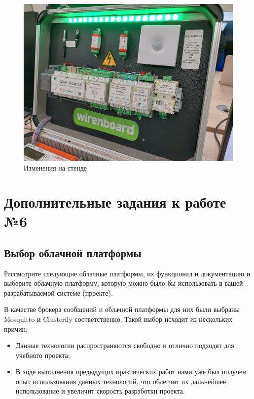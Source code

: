 \documentclass[a4paper,14pt]{extarticle}
\begin{document}
\begin{problem}
	
	\begin{figure}[htbp]
		\centering
		\includegraphics[width=0.6\linewidth]{images/ssh-powershell4.1}
		\caption{Изменения на стенде}
		\label{fig:ssh-stend}
	\end{figure}
	
\end{problem}


\newpage
\section{Дополнительные задания к работе №6}
\subsection{Выбор облачной платформы}

\begin{problem}
	Рассмотрите следующие облачные платформы, их функционал и документацию и выберите
	облачную платформу, которую можно было бы использовать в вашей разрабатываемой
	системе (проекте).
	
	
	\nonum
	
	В качестве брокера сообщений и облачной платформы для них были выбраны Mosquitto и Clusterfly соответственно. Такой выбор исходит из нескольких причин:
	\begin{itemize}
		\item Данные технологии распространяются свободно и отлично подходят для учебного проекта;
		
		\item В ходе выполнения предыдущих практических работ нами уже был получен опыт использования данных технологий, что облегчит их дальнейшее использование и увеличит скорость разработки проекта.
	\end{itemize}
\end{problem}
\end{document}

